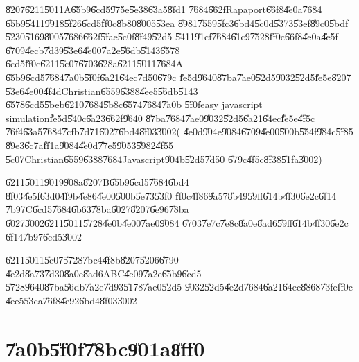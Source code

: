 \U{8207}\U{6211}\U{5011}A\U{65b9}\U{6cd5}\U{975e}\U{5e38}\U{63a5}\U{8fd1}%
\U{7684}\U{662f}Rapaport\U{66f8}\U{4e0a}\cite[Page 232]{rapaport}\U{7684}%
\U{65b9}\U{5411}\U{9918}\U{5f26}\U{6cd5}\U{ff0c}\U{8b80}\U{8005}\U{53ea}%
\U{8981}\U{7559}\U{5fc3}\U{6bd4}\U{5c0d}\U{5373}\U{53ef}\U{89c0}\U{5bdf}%
\U{5230}\U{5169}\U{8005}\U{7686}\U{662f}\U{5fae}\U{5c0f}\U{8f49}\U{52d5}%
\U{5411}\U{91cf}\U{7684}\U{61c9}\U{7528}\U{ff0c}\U{66f8}\U{4e0a}\U{4e5f}%
\U{6709}\U{4ecb}\U{7d39}\U{53e6}\U{4e00}\U{7a2e}\U{56db}\U{5143}\U{6578}%
\U{6cd5}\U{ff0c}\U{6211}\U{5c07}\U{6703}\U{628a}\U{6211}\U{5011}\U{7684}A%
\U{65b9}\U{6cd5}\U{7684}\U{7a0b}\U{5f0f}\U{6a21}\U{64ec}\U{7d50}\U{679c}%
\U{fe5d}\U{9640}\U{87ba}\U{7ae0}\U{52d5}\U{9032}\U{52d5}\U{fe5e}\U{8207}%
\U{53e6}\U{4e00}\U{4f4d}Christian\U{6559}\U{6388}\U{4ee5}\U{56db}\U{5143}%
\U{6578}\U{6cd5}\U{5beb}\U{6210}\U{7684}\U{5b8c}\U{6574}\U{7684}\U{7a0b}%
\U{5f0f}easy javascript simulation\U{fe5d}\U{540c}\U{6a23}\U{662f}\U{9640}%
\U{87ba}\U{7684}\U{7ae0}\U{9032}\U{52d5}\U{6a21}\U{64ec}\U{fe5e}\U{4f5c}%
\U{76f4}\U{63a5}\U{7684}\U{7cfb}\U{7d71}\U{6027}\U{6bd4}\U{8f03}\U{3002}(%
\U{4e0d}\U{904e}\U{9084}\U{6709}\U{4e00}\U{500b}\U{554f}\U{984c}\U{5f85}%
\U{89e3}\U{6c7a}\U{ff1a}\U{9084}\U{4e0d}\U{77e5}\U{9053}\U{5982}\U{4f55}%
\U{5c07}Christian\U{6559}\U{6388}\U{7684}Javascript\U{904b}\U{52d5}\U{7d50}%
\U{679c}\U{4f5c}\U{8f38}\U{51fa}\U{3002})

\bigskip

\U{6211}\U{5011}\U{9019}\U{908a}\U{8207}B\U{65b9}\U{6cd5}\U{7684}\U{6bd4}%
\U{8f03}\U{4e5f}\U{63d0}\U{4f9b}\U{4e86}\U{4e00}\U{500b}\U{5e73}\U{53f0}%
\U{ff0c}\U{4f86}\U{9a57}\U{8b49}\U{59ff}\U{614b}\U{4f30}\U{6e2c}\U{6f14}%
\U{7b97}C\U{6cd5}\U{7684}\U{6b63}\U{78ba}\U{6027}\U{8207}\U{6e96}\U{78ba}%
\U{6027}\U{3002}\U{6211}\U{5011}\U{5728}\U{4e0b}\U{4e00}\U{7ae0}\U{9084}%
\U{6703}\U{7e7c}\U{7e8c}\U{8a0e}\U{8ad6}\U{59ff}\U{614b}\U{4f30}\U{6e2c}%
\U{6f14}\U{7b97}\U{6cd5}\U{3002}

\bigskip

\U{6211}\U{5011}\U{5c07}\U{5728}\U{7bc4}\U{4f8b}\U{8207}\U{5206}\U{6790}%
\U{4e2d}\U{8a73}\U{7d30}\U{8a0e}\U{8ad6}ABC\U{4e09}\U{7a2e}\U{65b9}\U{6cd5}%
\U{5728}\U{9640}\U{87ba}\U{56db}\U{7a2e}\U{7d93}\U{5178}\U{7ae0}\U{52d5}%
\U{9032}\U{52d5}\U{4e2d}\U{7684}\U{6a21}\U{64ec}\U{8868}\U{73fe}\U{ff0c}%
\U{4ee5}\U{53ca}\U{76f8}\U{4e92}\U{6bd4}\U{8f03}\U{3002}

\clearpage

\section{\U{7a0b}\U{5f0f}\U{78bc}\U{901a}\U{8ff0}}

